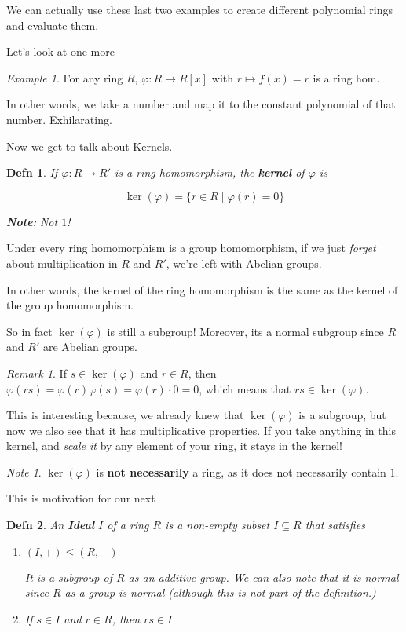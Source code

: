 \documentclass[12pt]{article}
\def\phi{\varphi}
\newtheorem{definition}{Defn}
\theoremstyle{remark}
\theoremstyle{remark}
\theoremstyle{remark}
\newtheorem{example}{Example}
\theoremstyle{remark}
\newtheorem*{remark}{Remark}
\theoremstyle{remark}
\newtheorem*{note}{Note}
\begin{document}
We can actually use these last two examples to create different polynomial rings
and evaluate them.

Let's look at one more

\begin{example}
  For any ring $R$, $\varphi: R \to R[x]$ with $r \mapsto f(x) = r$ is a ring
  hom.

  In other words, we take a number and map it to the constant polynomial of that
  number. Exhilarating.
\end{example}

Now we get to talk about Kernels.

\begin{definition}
  If $\varphi: R \to R'$ is a ring homomorphism, the {\bf kernel} of $\varphi$
  is 

  \[
    \ker(\phi) = \{ r \in R \mid \varphi(r) = 0 \}
  \]

  {\bf Note}: Not $1$!
\end{definition}

Under every ring homomorphism is a group homomorphism, if we just {\it forget}
about multiplication in $R$ and $R'$, we're left with Abelian groups.

In other words, the kernel of the ring homomorphism is the same as the kernel of
the group homomorphism.

So in fact $\ker(\phi)$ is still a subgroup! Moreover, its a normal subgroup
since $R$ and $R'$ are Abelian groups.

\begin{remark}
  If $s \in \ker(\varphi)$ and $r \in R$, then $\varphi(rs) =
  \varphi(r) \varphi(s) = \varphi(r) \cdot 0 = 0$, which means that $rs \in
  \ker(\varphi)$.
\end{remark}

This is interesting because, we already knew that $\ker(\varphi)$ is a subgroup,
but now we also see that it has multiplicative properties. If you take anything
in this kernel, and {\it scale it} by any element of your ring, it stays in the
kernel!

\begin{note}
  $\ker(\varphi)$ is {\bf not necessarily} a ring, as it does not necessarily
  contain $1$.
\end{note}

This is motivation for our next

\begin{definition}
  An {\bf Ideal} $I$ of a ring $R$ is a non-empty subset $I \subseteq R$ that
  satisfies

  \begin{enumerate}
    \item $(I, +) \le (R, +)$

      It is a subgroup of $R$ as an additive group. We can also note that it is
      normal since $R$ as a group is normal (although this is not part of the
      definition.)

    \item If $s \in I$ and $r \in R$, then $rs \in I$
  \end{enumerate}
\end{definition}
\end{document}
